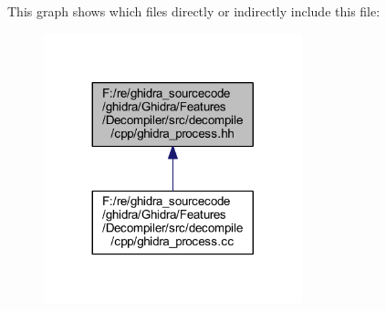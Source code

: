 This graph shows which files directly or indirectly include this file\+:
\nopagebreak
\begin{figure}[H]
\begin{center}
\leavevmode
\includegraphics[width=212pt]{ghidra__process_8hh__dep__incl}
\end{center}
\end{figure}
